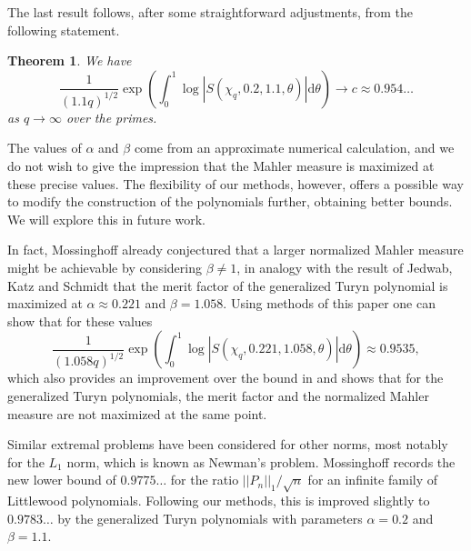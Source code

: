 \documentclass[12pt, a4paper]{amsart}
\newtheorem{theorem}{Theorem}
\theoremstyle{remark}
\newcommand{\ud}{\mathrm{d}}
\newcommand{\abs}[1]{\left|#1\right|}
\begin{document}
The last result follows, after some straightforward adjustments, from the following statement. 
\begin{theorem}\label{thm5} We have
    \[
        \frac{1}{(1.1q)^{1/2}}\exp\left(\int_0^1 \log \abs{S(\chi_q, 0.2, 1.1, \theta)}\ud\theta\right)
             \longrightarrow c\approx 0.954\ldots
    \]
as $q \rightarrow \infty$ over the primes.
\end{theorem}
The values of $\alpha$ and $\beta$ come from an approximate numerical
calculation, and we do not wish to give the impression that the Mahler
measure is maximized at these precise values.
The flexibility of our methods, however, offers a possible way to modify
the construction of the polynomials further, obtaining better bounds. We will explore this in
future work.

In fact, Mossinghoff \cite{mossinghoff-mahler} already conjectured that a larger normalized Mahler measure might
be achievable by considering $\beta \ne 1$, in analogy with the result of Jedwab,
Katz and Schmidt \cite{jedwab} that the merit factor of the generalized Turyn
polynomial is maximized at $\alpha \approx 0.221$ and $\beta = 1.058$. Using  methods of this paper one can show that for these values
\[
   \frac{1}{(1.058q)^{1/2}} \exp\left(\int_0^1 \log \abs{S(\chi_q, 0.221, 1.058, \theta)} \ud \theta\right) \approx 0.9535,
\]
which also provides an improvement over the bound in \cite{mossinghoff-mahler} and
shows that for the generalized Turyn polynomials, the merit factor and the
normalized Mahler measure are not maximized at the same point.


Similar extremal problems have been considered for other norms, most notably
for the $L_1$ norm, which is known as Newman's problem. Mossinghoff records the
new lower bound of $0.9775\ldots$ for the ratio $||P_n||_1/\sqrt{n}$ for an
infinite family of Littlewood polynomials. Following our methods, this is
improved slightly to $0.9783\ldots$ by the generalized Turyn polynomials with
parameters $\alpha = 0.2$ and $\beta=1.1$.
\end{document}
